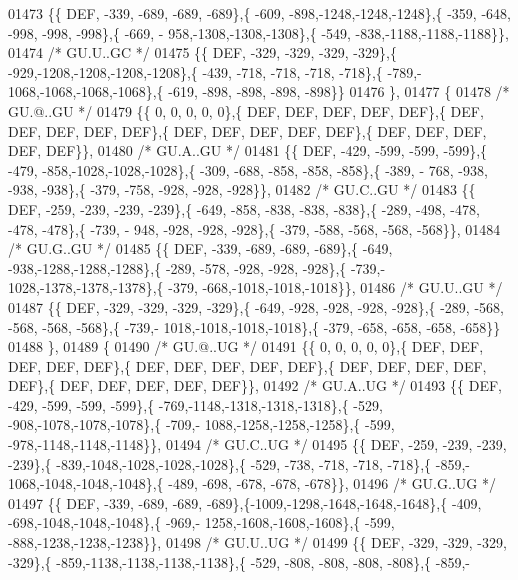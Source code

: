 \begin{DoxyCode}
01473 \{\{  DEF, -339, -689, -689, -689\},\{ -609, -898,-1248,-1248,-1248\},\{ -359, -648, -998, -998, -998\},\{ -669, -
      958,-1308,-1308,-1308\},\{ -549, -838,-1188,-1188,-1188\}\},
01474 \textcolor{comment}{/* GU.U..GC */}
01475 \{\{  DEF, -329, -329, -329, -329\},\{ -929,-1208,-1208,-1208,-1208\},\{ -439, -718, -718, -718, -718\},\{ -789,-
      1068,-1068,-1068,-1068\},\{ -619, -898, -898, -898, -898\}\}
01476 \},
01477 \{
01478 \textcolor{comment}{/* GU.@..GU */}
01479 \{\{    0,    0,    0,    0,    0\},\{  DEF,  DEF,  DEF,  DEF,  DEF\},\{  DEF,  DEF,  DEF,  DEF,  DEF\},\{  DEF,  
      DEF,  DEF,  DEF,  DEF\},\{  DEF,  DEF,  DEF,  DEF,  DEF\}\},
01480 \textcolor{comment}{/* GU.A..GU */}
01481 \{\{  DEF, -429, -599, -599, -599\},\{ -479, -858,-1028,-1028,-1028\},\{ -309, -688, -858, -858, -858\},\{ -389, -
      768, -938, -938, -938\},\{ -379, -758, -928, -928, -928\}\},
01482 \textcolor{comment}{/* GU.C..GU */}
01483 \{\{  DEF, -259, -239, -239, -239\},\{ -649, -858, -838, -838, -838\},\{ -289, -498, -478, -478, -478\},\{ -739, -
      948, -928, -928, -928\},\{ -379, -588, -568, -568, -568\}\},
01484 \textcolor{comment}{/* GU.G..GU */}
01485 \{\{  DEF, -339, -689, -689, -689\},\{ -649, -938,-1288,-1288,-1288\},\{ -289, -578, -928, -928, -928\},\{ -739,-
      1028,-1378,-1378,-1378\},\{ -379, -668,-1018,-1018,-1018\}\},
01486 \textcolor{comment}{/* GU.U..GU */}
01487 \{\{  DEF, -329, -329, -329, -329\},\{ -649, -928, -928, -928, -928\},\{ -289, -568, -568, -568, -568\},\{ -739,-
      1018,-1018,-1018,-1018\},\{ -379, -658, -658, -658, -658\}\}
01488 \},
01489 \{
01490 \textcolor{comment}{/* GU.@..UG */}
01491 \{\{    0,    0,    0,    0,    0\},\{  DEF,  DEF,  DEF,  DEF,  DEF\},\{  DEF,  DEF,  DEF,  DEF,  DEF\},\{  DEF,  
      DEF,  DEF,  DEF,  DEF\},\{  DEF,  DEF,  DEF,  DEF,  DEF\}\},
01492 \textcolor{comment}{/* GU.A..UG */}
01493 \{\{  DEF, -429, -599, -599, -599\},\{ -769,-1148,-1318,-1318,-1318\},\{ -529, -908,-1078,-1078,-1078\},\{ -709,-
      1088,-1258,-1258,-1258\},\{ -599, -978,-1148,-1148,-1148\}\},
01494 \textcolor{comment}{/* GU.C..UG */}
01495 \{\{  DEF, -259, -239, -239, -239\},\{ -839,-1048,-1028,-1028,-1028\},\{ -529, -738, -718, -718, -718\},\{ -859,-
      1068,-1048,-1048,-1048\},\{ -489, -698, -678, -678, -678\}\},
01496 \textcolor{comment}{/* GU.G..UG */}
01497 \{\{  DEF, -339, -689, -689, -689\},\{-1009,-1298,-1648,-1648,-1648\},\{ -409, -698,-1048,-1048,-1048\},\{ -969,-
      1258,-1608,-1608,-1608\},\{ -599, -888,-1238,-1238,-1238\}\},
01498 \textcolor{comment}{/* GU.U..UG */}
01499 \{\{  DEF, -329, -329, -329, -329\},\{ -859,-1138,-1138,-1138,-1138\},\{ -529, -808, -808, -808, -808\},\{ -859,-

\end{DoxyCode}
